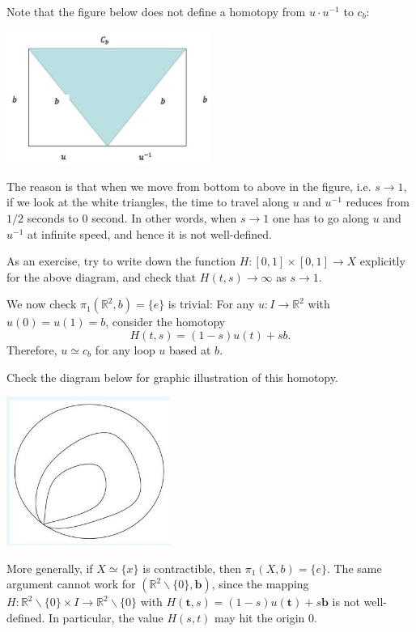 \begin{remark}
Note that the figure below does not define a homotopy from \(u \cdot  {u}^{-1}\) to \({c}_{b}\):
\begin{center}
\includegraphics[width=0.5\textwidth]{images/Ch7_inverse_countereg_pi1.jpg}
\end{center}
The reason is that when we move from bottom to above in the figure, i.e. \(s \rightarrow  1\), if we look at the white triangles, the time to travel along \(u\) and \({u}^{-1}\) reduces from $1/2$ seconds to $0$ second. In other words, when $s \to 1$ one has to go along \(u\) and \({u}^{-1}\) at infinite speed, and hence it is not well-defined. 

As an exercise, try to write down the function $H:[0,1] \times [0,1] \to X$ explicitly for the above diagram, and check that $H(t,s) \to \infty$ as $s \to 1$.
\end{remark}

\begin{example} We now check \({\pi }_{1}\left( {{\mathbb{R}}^{2},b}\right)  = \{ e\}\) is trivial: For any \(u : I \rightarrow  {\mathbb{R}}^{2}\) with \(u\left( 0\right)  = u\left( 1\right)  = b\), consider the homotopy
\[
H\left( {t,s}\right)  = \left( {1 - s}\right) u\left( t\right)  + {sb}.
\]
Therefore, \(u \simeq  {c}_{b}\) for any loop \(u\) based at \(b\). 

Check the diagram below for graphic illustration of this homotopy.
\begin{center}
\includegraphics[width=0.4\textwidth]{images/Ch7_R2_trivial_pi1.jpg}
\end{center}

More generally, if \(X \simeq  \{ x\}\) is contractible, then \({\pi }_{1}\left( {X,b}\right)  = \{ e\}\). The same argument cannot work for \(\left( {{\mathbb{R}}^{2} \backslash \{ 0\},\mathbf{b}}\right)\), since the mapping \(H : {\mathbb{R}}^{2} \smallsetminus  \{ 0\}  \times  I \rightarrow  {\mathbb{R}}^{2} \smallsetminus  \{ 0\}\) with
\(H\left( {\mathbf{t},s}\right)  = \left( {1 - s}\right) u\left( \mathbf{t}\right)  + s\mathbf{b}\) is not well-defined. In particular, the value \(H\left( {s,t}\right)\) may hit the origin 0.
\end{example}

